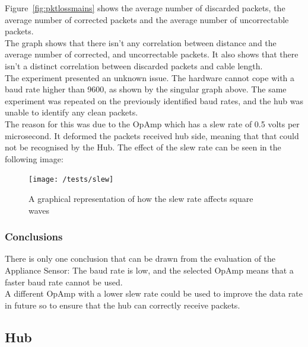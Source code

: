 \documentclass[draft,preprint,12pt,3p]{elsarticle}
\begin{document}
Figure~\ref{fig:pktlossmains} shows the average number of discarded packets, the average number of corrected packets and the average number of uncorrectable packets.\\
The graph shows that there isn't any correlation between distance and the average number of corrected, and uncorrectable packets. It also shows that there isn't a distinct correlation between discarded packets and cable length.\\
The experiment presented an unknown issue. The hardware cannot cope with a baud rate higher than 9600, as shown by the singular graph above. The same experiment was repeated on the previously identified baud rates, and the hub was unable to identify any clean packets.\\
The reason for this was due to the OpAmp which has a slew rate of 0.5 volts per microsecond. It deformed the packets received hub side, meaning that that could not be recognised by the Hub. The effect of the slew rate can be seen in the following image:
\begin{figure}[H]
    \centering
    \texttt{[image: /tests/slew]}
    \caption {A graphical representation of how the slew rate affects square waves~\cite{slew}}
\end{figure}

\subsubsection{Conclusions}
There is only one conclusion that can be drawn from the evaluation of the Appliance Sensor: The baud rate is low, and the selected OpAmp means that a faster baud rate cannot be used.\\
A different OpAmp with a lower slew rate could be used to improve the data rate in future so to ensure that the hub can correctly receive packets.

\clearpage
\subsection{Hub}
\end{document}

